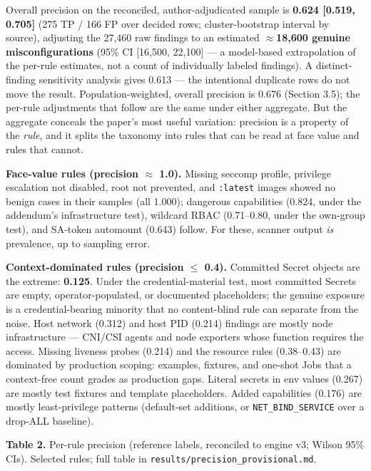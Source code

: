 \documentclass[pdflatex,sn-basic]{sn-jnl}
\begin{document}
Overall precision on the reconciled, author-adjudicated sample is
\textbf{0.624 {[}0.519, 0.705{]}} (275 TP / 166 FP over decided rows;
cluster-bootstrap interval by source), adjusting the 27,460 raw findings
to an estimated \textbf{$\approx$18,600 genuine misconfigurations} (95\% CI {[}16,500, 22,100{]} --- a model-based extrapolation of the per-rule
estimates, not a count of individually labeled findings). A
distinct-finding sensitivity analysis gives 0.613 --- the intentional
duplicate rows do not move the result. Population-weighted, overall
precision is 0.676 (Section 3.5); the per-rule adjustments that follow
are the same under either aggregate. But the aggregate conceals the
paper's most useful variation: precision is a property of the
\emph{rule}, and it splits the taxonomy into rules that can be read at
face value and rules that cannot.

\textbf{Face-value rules (precision $\approx$ 1.0).} Missing seccomp profile,
privilege escalation not disabled, root not prevented, and
\texttt{:latest} images showed no benign cases in their samples (all
1.000); dangerous capabilities (0.824, under the addendum's infrastructure test), wildcard RBAC (0.71--0.80, under the own-group test), and SA-token automount (0.643) follow. For these, scanner output \emph{is} prevalence, up to sampling error.

\textbf{Context-dominated rules (precision $\leq$ 0.4).} Committed Secret
objects are the extreme: \textbf{0.125}. Under the credential-material
test, most committed Secrets are empty, operator-populated, or
documented placeholders; the genuine exposure is a credential-bearing
minority that no content-blind rule can separate from the noise. Host
network (0.312) and host PID (0.214) findings are mostly node
infrastructure --- CNI/CSI agents and node exporters whose function
requires the access. Missing liveness probes (0.214) and the resource
rules (0.38--0.43) are dominated by production scoping: examples,
fixtures, and one-shot Jobs that a context-free count grades as
production gaps. Literal secrets in env values (0.267) are mostly test fixtures and template placeholders. Added capabilities (0.176) are mostly least-privilege patterns (default-set additions, or \texttt{NET\_BIND\_SERVICE} over a drop-ALL baseline).

\textbf{Table 2.} Per-rule precision (reference labels, reconciled to
engine v3; Wilson 95\% CIs). Selected rules; full table in
\texttt{results/precision\_provisional.md}.
\end{document}
